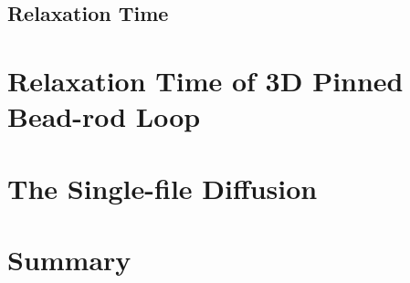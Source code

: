 \subsection{Relaxation Time}
\label{sub:relaxation_time}





\section{Relaxation Time of 3D Pinned Bead-rod Loop}
\label{sec:relaxation_time_of_3d_pinned_bead_rod_loop}


\section{The Single-file Diffusion}
\label{sec:the_single_file_diffusion}



\section{Summary}
\label{sec:summary}
